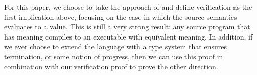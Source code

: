 For this paper, we choose to take the approach of \cite{chlipala} and define
verification as the first implication above, focusing on the case in which the
source semantics evaluates to a value. This is still a very strong result: any
source program that has meaning compiles to an executable with equivalent
meaning. In addition, if we ever choose to extend the language with a type
system that ensures termination, or some notion of progress, then we can use
this proof in combination with our verification proof to prove the other
direction. 
